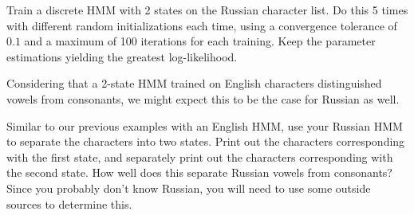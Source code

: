 \begin{problem}
Train a discrete HMM with 2 states on the Russian character list. Do this 5 times with different random initializations each time, using a convergence tolerance of $0.1$ and a maximum of 100 iterations for each training. Keep the parameter estimations yielding the greatest log-likelihood.
\end{problem}

Considering that a 2-state HMM trained on English characters distinguished vowels from consonants, we might expect this to be the case for Russian as well.

\begin{problem}
Similar to our previous examples with an English HMM, use your Russian HMM to separate the characters into two states. Print out the characters corresponding with the first state, and separately print out the characters corresponding with the second state. How well does this separate Russian vowels from consonants? Since you probably don't know Russian, you will need to use some outside sources to determine this.
\end{problem}